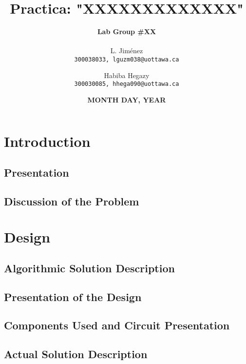 \documentclass[16pt, letterpaper]{article}
\title{ 
    \textbf{\huge Practica: "XXXXXXXXXXXXX" } 
    \newline \newline {\Large CEG2136 Section A \\ TA('s): ``xxxx" }
	   }
\author{\textbf{\Large Lab Group \#XX} \\ \\
	L. Jiménez\\
	\texttt{300038033, lguzm038@uottawa.ca}
	\and 
	Habiba Hegazy\\
	\texttt{300030085, hhega090@uottawa.ca} 	
		}
\date{\textbf{MONTH DAY, YEAR}}
\begin{document}
	
	\begin{titlepage}
		\maketitle
	\end{titlepage}

	{ \large \tableofcontents }
	\newpage
	



		\section{Introduction}
		
			\subsection{Presentation}
		
			\subsection{Discussion of the Problem}
			
			
	
		\section{Design}
		
			\subsection{Algorithmic Solution Description}
			
			
			
			\subsection{Presentation of the Design}
			
			
			
			\subsection{Components Used and Circuit Presentation}
			
			
			
			\subsection{Actual Solution Description}
			
			
			
\end{document}
